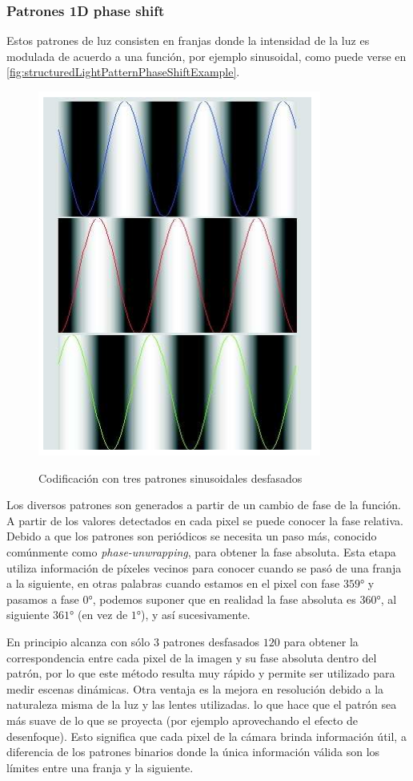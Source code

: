\subsubsection{Patrones 1D phase shift}
Estos patrones de luz consisten en franjas donde la intensidad de la luz es modulada de acuerdo a una función, por ejemplo sinusoidal, como puede verse en \autoref{fig:structuredLightPatternPhaseShiftExample}.

\begin{figure}[bth]
    \myfloatalign
        {\includegraphics[width=0.4\linewidth]{images/structuredLightPatternPhaseShiftExample}}
        \caption{Codificación con tres patrones sinusoidales desfasados}
        \label{fig:structuredLightPatternPhaseShiftExample}
\end{figure}

Los diversos patrones son generados a partir de un cambio de fase de la función. A partir de los valores detectados en cada pixel se puede conocer la fase relativa. Debido a que los patrones son periódicos se necesita un paso más, conocido comúnmente como \emph{phase-unwrapping}, para obtener la fase absoluta. Esta etapa utiliza información de píxeles vecinos para conocer cuando se pasó de una franja a la siguiente, en otras palabras cuando estamos en el pixel con fase $359$° y pasamos a fase $0$°, podemos suponer que en realidad la fase absoluta es $360$°, al siguiente $361$° (en vez de $1$°), y así sucesivamente.

En principio alcanza con sólo $3$ patrones desfasados $120$ para obtener la correspondencia entre cada pixel de la imagen y su fase absoluta dentro del patrón, por lo que este método resulta muy rápido y permite ser utilizado para medir escenas dinámicas. Otra ventaja es la mejora en resolución debido a la naturaleza misma de la luz y las lentes utilizadas. lo que hace que el patrón sea más suave de lo que se proyecta (por ejemplo aprovechando el efecto de desenfoque). Esto significa que cada pixel de la cámara brinda información útil, a diferencia de los patrones binarios donde la única información válida son los límites entre una franja y la siguiente.

